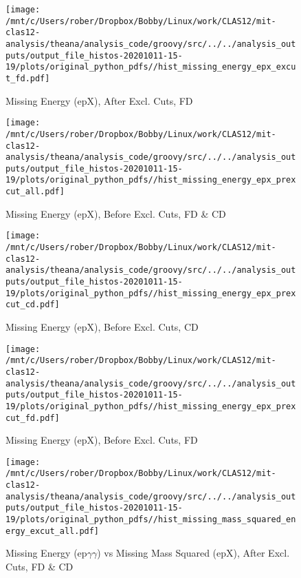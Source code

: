 \documentclass{article}
\begin{document}
\begin{landscape}
\begin{figure}[h]
        \texttt{[image: /mnt/c/Users/rober/Dropbox/Bobby/Linux/work/CLAS12/mit-clas12-analysis/theana/analysis\_code/groovy/src/../../analysis\_outputs/output\_file\_histos-20201011-15-19/plots/original\_python\_pdfs//hist\_missing\_energy\_epx\_excut\_fd.pdf]}
        \captionsetup{textformat=empty,labelformat=blank}
        \caption{Missing Energy (epX), After Excl. Cuts, FD}
    \end{figure}
    \clearpage
    
    \begin{figure}[h]
        \centering

        \texttt{[image: /mnt/c/Users/rober/Dropbox/Bobby/Linux/work/CLAS12/mit-clas12-analysis/theana/analysis\_code/groovy/src/../../analysis\_outputs/output\_file\_histos-20201011-15-19/plots/original\_python\_pdfs//hist\_missing\_energy\_epx\_prexcut\_all.pdf]}
        \captionsetup{textformat=empty,labelformat=blank}
        \caption{Missing Energy (epX), Before Excl. Cuts, FD \& CD}
    \end{figure}
    \clearpage
    
    \begin{figure}[h]
        \centering

        \texttt{[image: /mnt/c/Users/rober/Dropbox/Bobby/Linux/work/CLAS12/mit-clas12-analysis/theana/analysis\_code/groovy/src/../../analysis\_outputs/output\_file\_histos-20201011-15-19/plots/original\_python\_pdfs//hist\_missing\_energy\_epx\_prexcut\_cd.pdf]}
        \captionsetup{textformat=empty,labelformat=blank}
        \caption{Missing Energy (epX), Before Excl. Cuts, CD}
    \end{figure}
    \clearpage
    
    \begin{figure}[h]
        \centering

        \texttt{[image: /mnt/c/Users/rober/Dropbox/Bobby/Linux/work/CLAS12/mit-clas12-analysis/theana/analysis\_code/groovy/src/../../analysis\_outputs/output\_file\_histos-20201011-15-19/plots/original\_python\_pdfs//hist\_missing\_energy\_epx\_prexcut\_fd.pdf]}
        \captionsetup{textformat=empty,labelformat=blank}
        \caption{Missing Energy (epX), Before Excl. Cuts, FD}
    \end{figure}
    \clearpage
    
    \begin{figure}[h]
        \centering

        \texttt{[image: /mnt/c/Users/rober/Dropbox/Bobby/Linux/work/CLAS12/mit-clas12-analysis/theana/analysis\_code/groovy/src/../../analysis\_outputs/output\_file\_histos-20201011-15-19/plots/original\_python\_pdfs//hist\_missing\_mass\_squared\_energy\_excut\_all.pdf]}
        \captionsetup{textformat=empty,labelformat=blank}
        \caption{Missing Energy (ep$\gamma$$\gamma$) vs Missing Mass Squared (epX), After Excl. Cuts, FD \& CD}
    \end{figure}
    \clearpage
    

\end{landscape}
\end{document}
